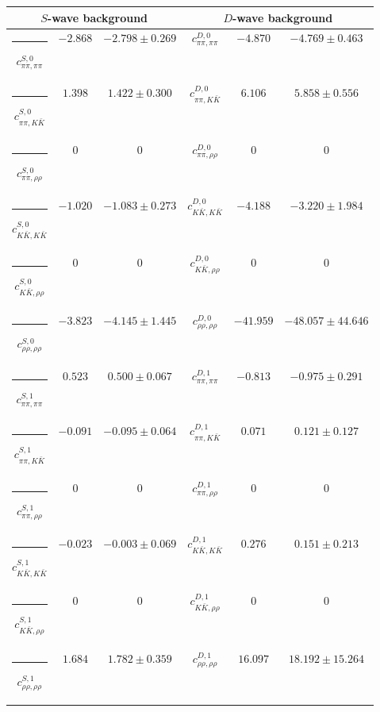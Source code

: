 \begin{table}[h]
\begin{ruledtabular}
\begin{tabular}{c c c c c c c c c}
\end{tabular}
\vspace{2em}
\begin{tabular}{c c c c c c}
\multicolumn{3}{c}{$S$-wave background}  & \multicolumn{3}{c}{$D$-wave background} \\ \hline
\rule[-0.2cm]{-0.1cm}{.55cm} $c^{S,0}_{\pi\pi,\pi\pi}$ &$-2.868$ & $-2.798 \pm 0.269$ & $c^{D,0}_{\pi\pi,\pi\pi}$ &$-4.870$ & $-4.769 \pm 0.463$ \\
\rule[-0.2cm]{-0.1cm}{.55cm} $c^{S,0}_{\pi\pi,K\bar K}$ &$1.398$ & $1.422 \pm 0.300$ & $c^{D,0}_{\pi\pi,K\bar K}$ &$6.106$ & $5.858 \pm 0.556$ \\
\rule[-0.2cm]{-0.1cm}{.55cm} $c^{S,0}_{\pi\pi,\rho\rho}$ &$0$ & $0$ & $c^{D,0}_{\pi\pi,\rho\rho}$ &$0$ & $0$ \\
\rule[-0.2cm]{-0.1cm}{.55cm} $c^{S,0}_{K\bar K,K\bar K}$ &$-1.020$ & $-1.083 \pm 0.273$ & $c^{D,0}_{K\bar K,K\bar K}$ &$-4.188$ & $-3.220 \pm 1.984$ \\
\rule[-0.2cm]{-0.1cm}{.55cm} $c^{S,0}_{K\bar K,\rho\rho}$ &$0$ & $0$ & $c^{D,0}_{K\bar K,\rho\rho}$ &$0$ & $0$ \\
\rule[-0.2cm]{-0.1cm}{.55cm} $c^{S,0}_{\rho\rho,\rho\rho}$ &$-3.823$ & $-4.145 \pm 1.445$ & $c^{D,0}_{\rho\rho,\rho\rho}$ &$-41.959$ & $-48.057 \pm 44.646$ \\
\rule[-0.2cm]{-0.1cm}{.55cm} $c^{S,1}_{\pi\pi,\pi\pi}$ &$0.523$ & $0.500 \pm 0.067$ & $c^{D,1}_{\pi\pi,\pi\pi}$ &$-0.813$ & $-0.975 \pm 0.291$ \\
\rule[-0.2cm]{-0.1cm}{.55cm} $c^{S,1}_{\pi\pi,K\bar K}$ &$-0.091$ & $-0.095 \pm 0.064$ & $c^{D,1}_{\pi\pi,K\bar K}$ &$0.071$ & $0.121 \pm 0.127$ \\
\rule[-0.2cm]{-0.1cm}{.55cm} $c^{S,1}_{\pi\pi,\rho\rho}$ &$0$ & $0$ & $c^{D,1}_{\pi\pi,\rho\rho}$ &$0$ & $0$ \\
\rule[-0.2cm]{-0.1cm}{.55cm} $c^{S,1}_{K\bar K,K\bar K}$ &$-0.023$ & $-0.003 \pm 0.069$ & $c^{D,1}_{K\bar K,K\bar K}$ &$0.276$ & $0.151 \pm 0.213$ \\
\rule[-0.2cm]{-0.1cm}{.55cm} $c^{S,1}_{K\bar K,\rho\rho}$ &$0$ & $0$ & $c^{D,1}_{K\bar K,\rho\rho}$ &$0$ & $0$ \\
\rule[-0.2cm]{-0.1cm}{.55cm} $c^{S,1}_{\rho\rho,\rho\rho}$ &$1.684$ & $1.782 \pm 0.359$ & $c^{D,1}_{\rho\rho,\rho\rho}$ &$16.097$ & $18.192 \pm 15.264$ \\
\end{tabular}
\end{ruledtabular}
\end{table}
